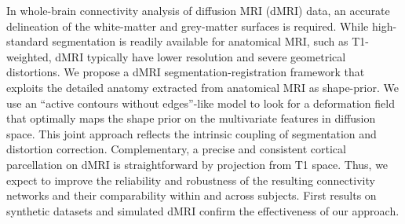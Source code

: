 In whole-brain connectivity analysis of diffusion MRI (dMRI) data,
an accurate delineation of the white-matter and grey-matter surfaces is required.
While high-standard segmentation is readily available for anatomical MRI, such 
as T1-weighted, dMRI typically have lower resolution and severe 
geometrical distortions. We propose a dMRI segmentation-registration framework 
that exploits the detailed anatomy extracted from anatomical MRI as shape-prior.
We use an ``active contours without edges''-like model to look for a deformation
field that optimally maps the shape prior on the multivariate features 
in diffusion space. This joint approach reflects the intrinsic coupling of 
segmentation and distortion correction. Complementary, a precise and consistent
cortical parcellation on dMRI is straightforward by projection from T1 space. Thus,
we expect to improve the reliability and robustness of the resulting connectivity 
networks and their comparability within and across subjects. First results 
on synthetic datasets and simulated dMRI confirm the effectiveness of our approach.